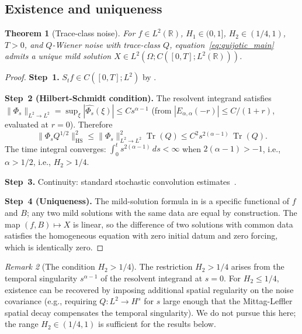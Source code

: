 \documentclass[11pt]{article}
\newtheorem{theorem}{Theorem}[section]
\theoremstyle{definition}
\theoremstyle{remark}
\newtheorem{remark}[theorem]{Remark}
\DeclareMathOperator{\Tr}{Tr}
\newcommand{\R}{\mathbb{R}}
\newcommand{\norm}[1]{\| #1 \|}
\begin{document}
\subsection{Existence and uniqueness}

\begin{theorem}[Trace-class noise]
\label{thm:existence_trace}
For $f \in L^2(\R)$, $H_1 \in (0,1]$, $H_2 \in (1/4,1)$,
$T > 0$, and $Q$-Wiener noise with trace-class $Q$,
equation~\eqref{eq:quijotic_main} admits a unique mild
solution $X \in L^2(\Omega; C([0,T]; L^2(\R)))$.
\end{theorem}

\begin{proof}
\textbf{Step~1.} $S_t f \in C([0,T]; L^2)$ by
.

\textbf{Step~2 (Hilbert-Schmidt condition).}
The resolvent integrand satisfies
$\norm{\Phi_s}_{L^2 \to L^2}
= \sup_\xi |\widehat{\Phi_s}(\xi)|
\leq C s^{\alpha-1}$
(from $|E_{\alpha,\alpha}(-r)| \leq C/(1+r)$,
evaluated at $r = 0$).  Therefore
\[
\norm{\Phi_s Q^{1/2}}_{\mathrm{HS}}^2
\leq \norm{\Phi_s}_{L^2 \to L^2}^2 \Tr(Q)
\leq C^2 s^{2(\alpha-1)}\,\Tr(Q).
\]
The time integral converges:
$\int_0^t s^{2(\alpha-1)}\, ds < \infty$
when $2(\alpha-1) > -1$, i.e., $\alpha > 1/2$, i.e.,
$H_2 > 1/4$.

\textbf{Step~3.} Continuity: standard stochastic
convolution estimates~\cite{daprato2014}.

\textbf{Step~4 (Uniqueness).}  The mild-solution
formula in  is a specific functional
of $f$ and $B$; any two mild solutions with the same
data are equal by construction.  The map
$(f, B) \mapsto X$ is linear, so the difference of
two solutions with common data satisfies the
homogeneous equation with zero initial datum and
zero forcing, which is identically zero.
\end{proof}

\begin{remark}[The condition $H_2 > 1/4$]
\label{rem:H2_quarter}
The restriction $H_2 > 1/4$ arises from the temporal
singularity $s^{\alpha-1}$ of the resolvent integrand
at $s = 0$.  For $H_2 \leq 1/4$, existence can be
recovered by imposing additional spatial regularity on
the noise covariance (e.g., requiring $Q : L^2 \to H^s$
for $s$ large enough that the Mittag-Leffler spatial
decay compensates the temporal singularity).  We do not
pursue this here; the range $H_2 \in (1/4, 1)$ is
sufficient for the results below.
\end{remark}
\end{document}
